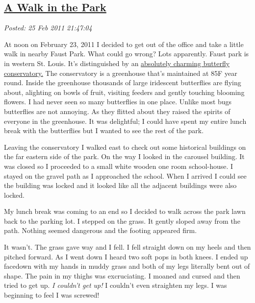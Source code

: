 %

\subsection*{\href{https://bakerjd99.wordpress.com/2011/02/25/a-walk-in-the-park/}{A Walk in the Park}}


\noindent\emph{Posted: 25 Feb 2011 21:47:04}
\vspace{6pt}

At noon on February 23, 2011 I decided to get out of the office and take
a little walk in nearby Faust Park. What could go wrong? Lots
apparently. Faust park is in western St. Louis. It's distinguished by an
\href{http://www.butterflyhouse.org/}{absolutely charming butterfly
conservatory.} The conservatory is a greenhouse that's maintained at 85F
year round. Inside the greenhouse thousands of large iridescent
butterflies are flying about, alighting on bowls of fruit, visiting
feeders and gently touching blooming flowers. I had never seen so many
butterflies in one place. Unlike most bugs butterflies are not annoying.
As they flitted about they raised the spirits of everyone in the
greenhouse. It was delightful; I could have spent my entire lunch break
with the butterflies but I wanted to see the rest of the park.

Leaving the conservatory I walked east to check out some historical
buildings on the far eastern side of the park. On the way I looked in
the carousel building. It was closed so I proceeded to a small white
wooden one room school-house. I stayed on the gravel path as I
approached the school. When I arrived I could see the building was
locked and it looked like all the adjacent buildings were also locked.

My lunch break was coming to an end so I decided to walk across the park
lawn back to the parking lot. I stepped on the grass. It gently sloped
away from the path. Nothing seemed dangerous and the footing appeared
firm.

It wasn't. The grass gave way and I fell. I fell straight down on my
heels and then pitched forward. As I went down I heard two soft pops in
both knees. I ended up facedown with my hands in muddy grass and both of
my legs literally bent out of shape. The pain in my thighs was
excruciating. I moaned and cursed and then tried to get up. \emph{I
couldn't get up!} I couldn't even straighten my legs. I was beginning to
feel I was screwed!


